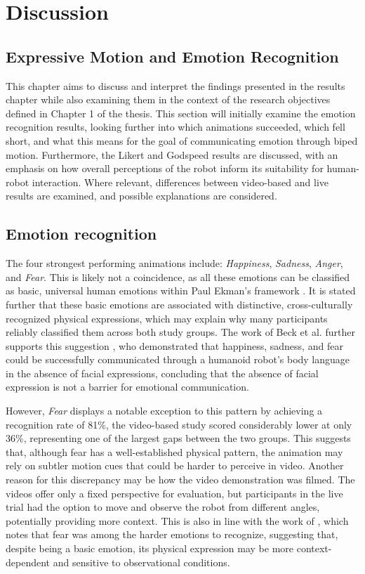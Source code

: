 \chapter{Discussion}
\section{Expressive Motion and Emotion Recognition}
This chapter aims to discuss and interpret the findings presented in the results chapter while also examining them in the context of the research objectives defined in Chapter 1 of the thesis. 
This section will initially examine the emotion recognition results, looking further into which animations succeeded, which fell short, and what this means for the goal of communicating emotion through biped motion. Furthermore, the Likert and Godspeed results are discussed, with an emphasis on how overall perceptions of the robot inform its suitability for human-robot interaction. Where relevant, differences between video-based and live results are examined, and possible explanations are considered.

\section{Emotion recognition}
The four strongest performing animations include:  \textit{Happiness}, 
\textit{Sadness}, \textit{Anger}, and \textit{Fear}. This is likely not a coincidence, as all these emotions can be classified as basic, universal human emotions within Paul Ekman's framework \cite{ekman1999basic}. It is stated further that these basic emotions are associated with distinctive, cross-culturally recognized physical expressions, which may explain why many participants reliably classified them across both study groups. The work of Beck et al. further supports this suggestion \cite{beck_interpretation_2010}, who demonstrated that happiness, sadness, and fear could be successfully communicated through a humanoid robot's body language in the absence of facial expressions, concluding that the absence of facial expression is not a barrier for emotional communication.

However, \textit{Fear} displays a notable exception to this pattern by achieving a recognition rate of 81\%, the 
video-based study scored considerably lower at only 36\%, representing one of the largest gaps between the two groups. This suggests that, although fear has a well-established physical pattern, the animation may rely on subtler motion cues that could be harder to perceive in video. Another reason for this discrepancy may be how the video demonstration was filmed. The videos offer only a fixed perspective for evaluation, but participants in the live trial had the option to move and observe the robot from different angles, potentially providing more context. This is also in line with the work of \cite{beck_interpretation_2010}, which notes that fear was among the harder emotions to recognize, suggesting that, despite being a basic emotion, its physical expression may be more context-dependent and sensitive to observational conditions.

